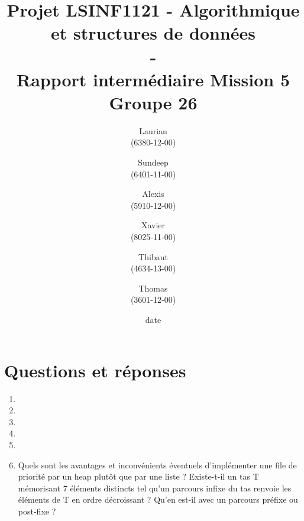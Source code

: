\documentclass[11pt]{article}
\title{\textbf{Projet LSINF1121 -  Algorithmique et structures de données\\ - \\ Rapport intermédiaire Mission 5} \\ {\large Groupe 26}}
\author{Laurian \bsc{Detiffe} \\(6380-12-00)\and Sundeep \bsc{Dhillon} \\(6401-11-00)\and Alexis \bsc{Macq} \\ (5910-12-00) \and Xavier \bsc{Pérignon} \\ (8025-11-00)\and Thibaut \bsc{Piquard}\\(4634-13-00)\and Thomas \bsc{Wyckmans} \\ (3601-12-00)}
\date{date}
\date{\vspace*{25mm}
\texttt{[image: logo.jpg]}\\
		\vspace*{30mm}
		\begin{center}
		Année académique 2015-2016 \\	
		\end{center}}
\begin{document}
\thispagestyle{empty}

\maketitle
\thispagestyle{empty}

\section*{Questions et réponses}
\begin{enumerate}

\item
\item
\item
\item
\item
\item Quels sont les avantages et inconvénients éventuels d’implémenter une file de
priorité par un heap plutôt que par une liste ?
Existe-t-il un tas T mémorisant 7 éléments distincts tel qu’un parcours infixe du
tas renvoie les éléments de T en ordre décroissant ? Qu’en est-il avec un parcours
préfixe ou post-fixe ?


\end{enumerate}
\end{document}
